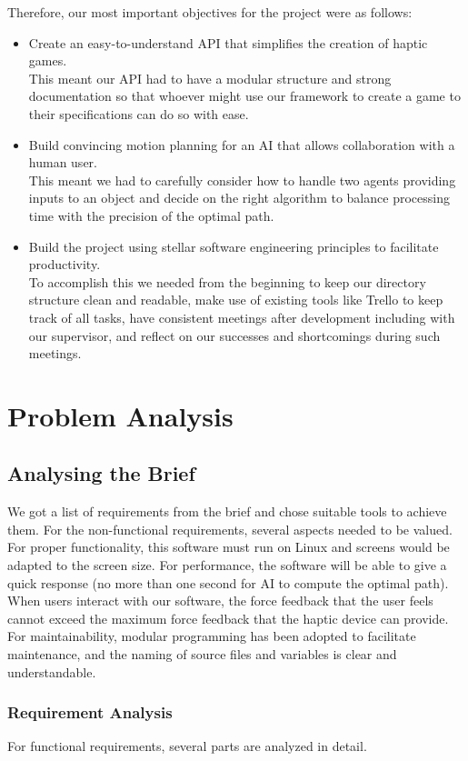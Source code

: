 \documentclass[a4paper]{article}
\begin{document}
Therefore, our most important objectives for the project were as follows:
\begin{itemize}
    \item Create an easy-to-understand API that simplifies the creation of haptic games.
\\ This meant our API had to have a modular structure and strong documentation so that whoever might use our framework to create a game to their specifications can do so with ease.
    \item Build convincing motion planning for an AI that allows collaboration with a human user.
\\ This meant we had to carefully consider how to handle two agents providing inputs to an object and decide on the right algorithm to balance processing time with the precision of the optimal path.
    \item Build the project using stellar software engineering principles to facilitate productivity.
\\ To accomplish this we needed from the beginning to keep our directory structure clean and readable, make use of existing tools like Trello to keep track of all tasks, have consistent meetings after development including with our supervisor, and reflect on our successes and shortcomings during such meetings. 
\end{itemize}

\section{Problem Analysis}
\subsection{Analysing the Brief}
We got a list of requirements from the brief and chose suitable tools to achieve them. For the non-functional requirements, several aspects needed to be valued. For proper functionality, this software must run on Linux and screens would be adapted to the screen size. For performance, the software will be able to give a quick response (no more than one second for AI to compute the optimal path).
When users interact with our software, the force feedback that the user feels cannot exceed the maximum force feedback that the haptic device can provide. For maintainability, modular programming has been adopted to facilitate maintenance, and the naming of source files and variables is clear and understandable.

\subsubsection{Requirement Analysis} 
For functional requirements, several parts are analyzed in detail.
\end{document}
